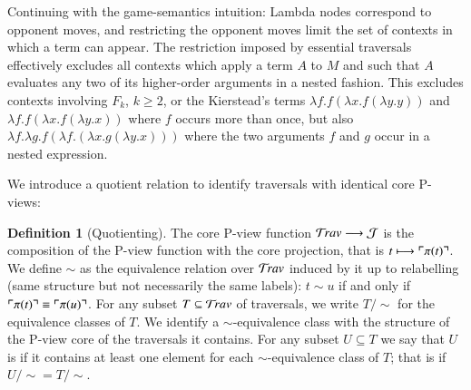 \documentclass{elsarticle}
\makeatletter
\newif\iflongversion
\theoremstyle{plain}
\newtheorem{property}[theorem]{Property}
\theoremstyle{definition}
\newtheorem{definition}{Definition}[section]
\theoremstyle{remark}
\newcommand\Nodes{\mathcal{N}}%
\newcommand\NodesLmd{\Nodes_\lambda}%
\newcommand{\travulc}{\travset}
\def\coresymbol{\pi} %
\newcommand{\core}[1]{\coresymbol(#1)} %
\newcommand{\ExternalNodes}{\Nodes^{\sf ext}}
\renewcommand\ie{{\it i.e.\@\xspace}}
\def\justseqset{\mathcal{J}}
\makeatother
\begin{document}
Continuing with the game-semantics intuition: Lambda nodes correspond to opponent moves, and restricting the opponent moves limit the set of contexts in which a term can appear. The restriction imposed by essential traversals effectively excludes all contexts which apply a term $A$ to $M$ and such that $A$ evaluates any two of its higher-order arguments in a nested fashion. This excludes contexts involving $F_k$, $k\geq 2$, or the Kierstead's terms $\lambda f .f (\lambda x .f (\lambda y.y))$ and $\lambda f .f (\lambda x .f (\lambda y.x))$ where $f$ occurs more than once, but also $\lambda f. \lambda g . f (\lambda f .(\lambda x . g (\lambda y . x)))$ where the two arguments $f$ and $g$ occur in a nested expression.

\iflongversion
\begin{property}
\label{prop:core_truncation_at_externallambda}
Let $t\in\travulc$ be a traversal which does not contain any ghost occurrence, and $m$ be an occurrence in $t$ of an external $\lambda$-node (\ie, $m \in \NodesLmd\inter\ExternalNodes$). Then $\core{t_{<m}} = \core{t}_{<m}$.
\end{property}
\begin{proof}
By an easy induction on $t$ using the fact that in the recursive calculation of $\coresymbol(t)$, external lambda nodes reset the stack of pending lambdas.
\end{proof}
\fi

We introduce a quotient relation to identify traversals with identical core P-views:
\begin{definition}[Quotienting]
The core P-view function
$\travulc \longrightarrow \justseqset $
is the composition of
the P-view function
 with the core projection,
 that is $t \longmapsto \pview{\core{t}}$.
We define $\sim$ as the equivalence relation over $\travulc$ induced by it up to relabelling (same structure but not necessarily the same labels): $t \sim u$ if and only if $\pview{\core{t}} \equiv \pview{\core{u}}$.
For any subset $T\subseteq \travulc$ of traversals, we write $T/{\sim}$ for the equivalence classes of $T$. We identify a $\sim$-equivalence class with the structure of the P-view core of the traversals it contains.
For any subset $U\subseteq T$ we say that $U$ is  if it contains at least one element for each $\sim$-equivalence class of $T$; that is if $U/{\sim} = T/{\sim}$.
\end{definition}
\end{document}
